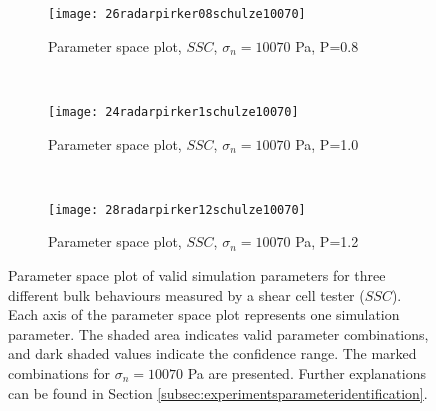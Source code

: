 \documentclass{llncs}
\begin{document}
\begin{figure}[htp] \centering
        \begin{subfigure}[b]{0.4\columnwidth}
        \texttt{[image: 26radarpirker08schulze10070]}
        \caption{Parameter space plot, $SSC$, $\sigma_n=10070$ Pa, P=0.8}
        \label{fig:26radarpirker08schulze10070} 
    \end{subfigure}\\
     \begin{subfigure}[b]{0.4\columnwidth}
        \texttt{[image: 24radarpirker1schulze10070]}
        \caption{Parameter space plot, $SSC$, $\sigma_n=10070$ Pa, P=1.0}
        \label{fig:24radarpirker1schulze10070}
    \end{subfigure} \\
        \begin{subfigure}[b]{0.4\columnwidth} 
        \texttt{[image: 28radarpirker12schulze10070]}
        \caption{Parameter space plot, $SSC$, $\sigma_n=10070$ Pa, P=1.2}
        \label{fig:28radarpirker12schulze10070} 
    \end{subfigure}
    \caption[Parameter space plot of valid simulations parameters for three different
    bulk behaviours measured by SSC]{Parameter space plot of valid simulation
    parameters for three different bulk behaviours measured by a shear cell
    tester ($SSC$).
    Each axis of the parameter space plot represents one simulation parameter.
    The shaded area indicates valid parameter combinations, and dark shaded
    values indicate the confidence range.
	The marked combinations for $\sigma_n=10070$ Pa are presented.
    Further explanations can be found in
   Section \ref{subsec:experimentsparameteridentification}.
   }
    \label{fig:29schulzeradarandcloud}
\end{figure}
\end{document}

